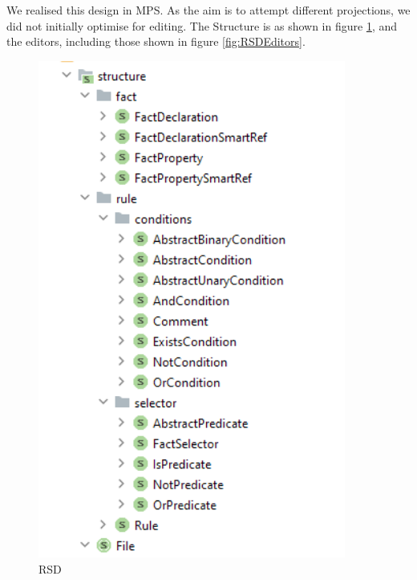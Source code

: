 We realised this design in MPS.
As the aim is to attempt different projections, we did not initially optimise for editing.
The Structure is as shown in figure \ref{fig:RSDStructure}, and the editors, including those shown in figure \ref{fig:RSDEditors}.

\begin{figure}
    \centering
    \includegraphics[width=0.9\textwidth]{Sections/images/RSRStructrure.png}
    \caption{RSD}
    \label{fig:RSDStructure}
\end{figure}

